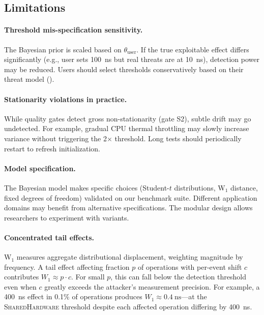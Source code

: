 \documentclass[letterpaper,twocolumn,10pt]{article}
\newcommand{\ns}[1]{\SI{#1}{\nano\second}}
\begin{document}
\subsection{Limitations}
\label{sec:discussion:limitations}

\paragraph{Threshold mis-specification sensitivity.}
The Bayesian prior is scaled based on $\theta_{\text{user}}$. If the true exploitable
effect differs significantly (e.g., user sets \ns{100} but real threats are at \ns{10}),
detection power may be reduced. Users should select thresholds conservatively based
on their threat model ().

\paragraph{Stationarity violations in practice.}
While quality gates detect gross non-stationarity (gate S2), subtle drift may go
undetected. For example, gradual CPU thermal throttling may slowly increase variance
without triggering the 2$\times$ threshold. Long tests should periodically restart
to refresh initialization.

\paragraph{Model specification.}
The Bayesian model makes specific choices (Student-$t$ distributions, W$_1$ distance,
fixed degrees of freedom) validated on our benchmark suite. Different application
domains may benefit from alternative specifications. The modular design allows
researchers to experiment with variants.

\paragraph{Concentrated tail effects.}
W$_1$ measures aggregate distributional displacement, weighting magnitude by
frequency. A tail effect affecting fraction $p$ of operations with per-event
shift $c$ contributes $W_1 \approx p \cdot c$. For small $p$, this can fall below
the detection threshold even when $c$ greatly exceeds the attacker's measurement
precision. For example, a \ns{400} effect in 0.1\% of operations produces
$W_1 \approx \ns{0.4}$---at the \textsc{SharedHardware} threshold despite each
affected operation differing by \ns{400}.
\end{document}
